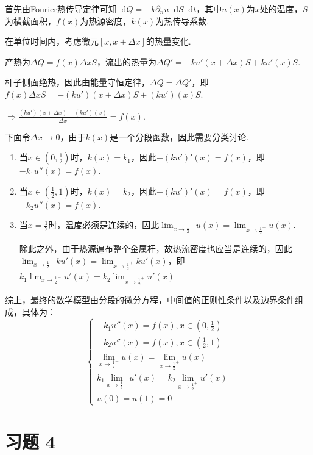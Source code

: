 \documentclass[a4paper,11pt]{ctexart}
\renewcommand{\d}{\mathop{}\!\mathrm{d}}
\begin{document}
首先由Fourier热传导定律可知$\d Q=-k\partial_n u\d S\d t$，其中$u(x)$为$x$处的温度，$S$为横截面积，$f(x)$为热源密度，$k(x)$为热传导系数.\par
在单位时间内，考虑微元$[x,x+\Delta x]$的热量变化.\par
产热为$\Delta Q=f(x)\Delta x S$，流出的热量为$\Delta Q'=-ku'(x+\Delta x)S+ku'(x)S$.\par
杆子侧面绝热，因此由能量守恒定律，$\Delta Q=\Delta Q'$，即$f(x)\Delta x S=-(ku')(x+\Delta x)S+(ku')(x)S$.\par
$\Rightarrow \frac{(ku')(x+\Delta x)-(ku')(x)}{\Delta x}=f(x)$.\par
下面令$\Delta x\to 0$，由于$k(x)$是一个分段函数，因此需要分类讨论.\par
\begin{enumerate}[label=(\arabic*)]
    \item 当$x\in \left(0,\frac{1}{2}\right)$时，$k(x)=k_1$，因此$-(ku')'(x)=f(x)$，即$-k_1u''(x)=f(x)$.
    \item 当$x\in \left(\frac{1}{2},1\right)$时，$k(x)=k_2$，因此$-(ku')'(x)=f(x)$，即$-k_2u''(x)=f(x)$.
    \item 当$x=\frac{1}{2}$时，温度必须是连续的，因此$\lim_{x\to \frac{1}{2}^-}{u(x)}=\lim_{x\to\frac{1}{2}^+}{u(x)}$.\par
    除此之外，由于热源遍布整个金属杆，故热流密度也应当是连续的，因此$\lim_{x\to \frac{1}{2}^-}{ku'(x)}=\lim_{x\to\frac{1}{2}^+}{ku'(x)}$，即$k_1\lim_{x\to \frac{1}{2}^-}{u'(x)}=k_2\lim_{x\to\frac{1}{2}^+}{u'(x)}$
\end{enumerate}
综上，最终的数学模型由分段的微分方程，中间值的正则性条件以及边界条件组成，具体为：
\[\begin{cases}
-k_1u''(x)=f(x), x\in \left(0,\frac{1}{2}\right)\\[10pt]
-k_2u''(x)=f(x), x\in \left(\frac{1}{2},1\right)\\[10pt]
\lim_{x\to \frac{1}{2}^-}{u(x)}=\lim_{x\to\frac{1}{2}^+}{u(x)}\\
k_1\lim_{x\to \frac{1}{2}^-}{u'(x)}=k_2\lim_{x\to\frac{1}{2}^+}{u'(x)}\\
u(0)=u(1)=0
\end{cases}\]

\section{习题 4}
\end{document}
